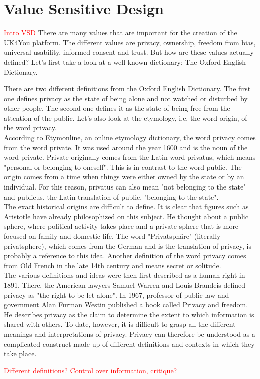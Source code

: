 \section{Value Sensitive Design}
\textcolor{red}{Intro VSD}
There are many values that are important for the creation of the UK4You platform.
The different values are privacy, ownership, freedom from bias, universal usability, informed consent and trust.
But how are these values actually defined?
Let's first take a look at a well-known dictionary: The Oxford English Dictionary.

There are two different definitions from the Oxford English Dictionary\cite{oxford-dictionary}.
The first one defines privacy as the state of being alone and not watched or disturbed by other people.
The second one defines it as the state of being free from the attention of the public.
Let's also look at the etymology, i.e. the word origin, of the word privacy.\\

According to Etymonline, an online etymology dictionary, the word privacy comes from the word private\cite{etymonline}.
It was used around the year 1600 and is the noun of the word private.
Private originally comes from the Latin word privatus, which means "personal or belonging to oneself". %
This is in contrast to the word public.
The origin comes from a time when things were either owned by the state or by an individual.
For this reason, privatus can also mean "not belonging to the state" and publicus, the Latin translation of public, "belonging to the state". \\ %

The exact historical origins are difficult to define.
It is clear that figures such as Aristotle have already philosophized on this subject\cite{stanford-philosophy}.
He thought about a public sphere, where political activity takes place and a private sphere that is more focused on family and domestic life.
The word "Privatsphäre" (literally privatsphere), which comes from the German and is the translation of privacy, is probably a reference to this idea.
Another definition of the word privacy comes from Old French in the late 14th century and means secret or solitude.\\

The various definitions and ideas were then first described as a human right in 1891\cite{history-of-privacy}.
There, the American lawyers Samuel Warren and Louis Brandeis defined privacy as "the right to be let alone".
In 1967, professor of public law and government Alan Furman Westin published a book called Privacy and freedom\cite{privacy-and-freedom}.
He describes privacy as the claim to determine the extent to which information is shared with others.
To date, however, it is difficult to grasp all the different meanings and interpretations of privacy.
Privacy can therefore be understood as a complicated construct made up of different definitions and contexts in which they take place.

\textcolor{red}{Different definitions? Control over information, critique?}

